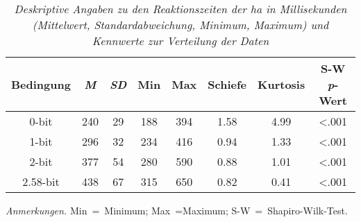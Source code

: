 \documentclass[11pt, twoside, a4paper]{book}		%
\begin{document}
\begin{table}[htb]
	\centering
	\captionsetup{labelsep = none}
	\caption[Deskriptive Angaben zu den Reaktionszeiten in der \gls{ha}]{\newline \textit{Deskriptive Angaben zu den Reaktionszeiten der \gls{ha} in Millisekunden (Mittelwert, Standardabweichung, Minimum, Maximum) und Kennwerte zur Verteilung der Daten} \vspace{.2cm}}
	\label{tab:hick_descriptives}
	\begin{threeparttable}
		
		\begin{tabular}{
				c
				S[table-format = 3.0, add-integer-zero=false]
				S[table-format = 2.0, add-integer-zero=false]
				S[table-format = 3.0, add-integer-zero=false]
				S[table-format = 3.0, add-integer-zero=false]
				S[table-format = 0.2, add-integer-zero=false]
				S[table-format = 1.2, add-integer-zero=false]
				S[table-format = <0.3, add-integer-zero=false]
			}
			\hline
			Bedingung	& 	{\textit{M}}&{\textit{SD}}	&	{Min}	&	{Max} 	&	{\textnormal{Schiefe}}	&	{\textnormal{Kurtosis}} &	{S-W \textit{p}-Wert}\\
			-bit		&	240			&	29			&	188		&	394		&	1.58					&	4.99					& 	<.001			\\
			1-bit		&	296			&	32			&	234		&	416		&	0.94					&	1.33					& 	<.001			\\
			2-bit		&	377			&	54			&	280		&	590		&	0.88					&	1.01					& 	<.001			\\
			2.58-bit	&	438			&	67			&	315		&	650		&	0.82					&	0.41					& 	<.001			\\
			\hline
		\end{tabular}%
		\begin{tablenotes}[flushleft]
			\footnotesize				%
			\setlength{}	%
			\item \textit{Anmerkungen.} Min~=~Minimum; Max~=Maximum; S-W~=~Shapiro-Wilk-Test.
		\end{tablenotes}%
	\end{threeparttable}%
\end{table}
\end{document}
